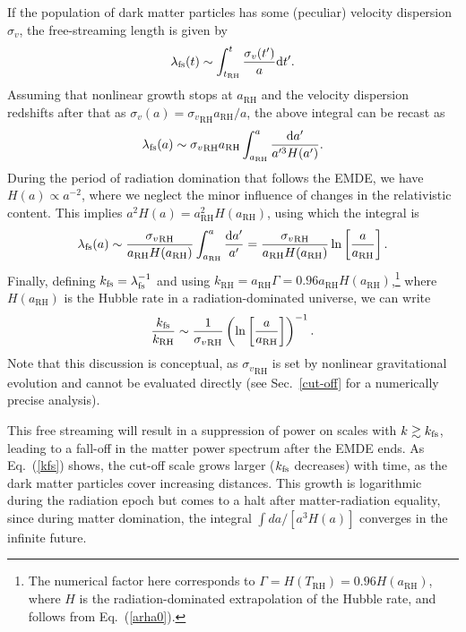 \documentclass[a4paper,11pt]{article}
\newcommand{\arh}{{a}_{\mathrm{RH}}}
\newcommand{\rh}[1]{{#1}_{\mathrm{RH}}}
\newcommand{\lfs}{\lambda_{\rm fs}}
\newcommand{\kfs}{k_{\rm fs}}
\newcommand{\diff}{\ensuremath{\mathrm{d}}}
\begin{document}
If the population of dark matter particles has some (peculiar) velocity dispersion $\sigma_v$, the free-streaming length is given by \begin{equation}
    \lfs (t) \sim \int^{t}_{\rh{t}} \frac{\sigma_v(t^\prime)}{a} \diff t^\prime.
\end{equation} Assuming that nonlinear growth stops at $\rh{a}$ and the velocity dispersion redshifts after that as $\sigma_v(a) = \rh{\sigma_v} \rh{a} / a$, the above integral can be recast as \begin{equation}
    \lfs (a) \sim  \rh{\sigma_v} \rh{a}\int^{a}_{\rh{a}} \frac{\diff a^\prime}{a^{\prime 3} H(a^\prime)}. 
\end{equation} During the period of radiation domination that follows the EMDE, we have $H(a) \propto a^{-2}$, where we neglect the minor influence of changes in the relativistic content. This implies $a^2 H(a) = \rh{a}^2 H(\rh{a})$, using which the integral is \begin{equation}\label{lfs}
    \lfs (a) \sim  \frac{\rh{\sigma_v}} {\rh{a} H(\rh{a})}\int^{a}_{\rh{a}} \frac{\diff a^\prime}{a^\prime} = \frac{\rh{\sigma_v}} {\rh{a} H(\rh{a})} \ln \left[\frac{a}{\rh{a}}\right].
\end{equation} Finally, defining $\kfs = \lfs^{-1}$ and using $\rh{k} = \rh{a} \Gamma = 0.96\rh{a} H(\rh{a})$,\footnote{\label{foot:H_RH}The numerical factor here corresponds to $\Gamma=H(\rh{T})=0.96 H(\rh{a})$, where $H$ is the radiation-dominated extrapolation of the Hubble rate, and follows from Eq.~(\ref{arha0}).}
where $H(\rh{a})$ is the Hubble rate in a radiation-dominated universe, we can write \begin{equation}\label{kfs}
    \frac{\kfs}{\rh{k}} \sim \frac{1}{\rh{\sigma_v}} \left(\ln \left[\frac{a}{\arh} \right] \right)^{-1}.
\end{equation}
Note that this discussion is conceptual, as $\rh{\sigma_v}$ is set by nonlinear gravitational evolution and cannot be evaluated directly (see Sec.~\ref{cut-off} for a numerically precise analysis).


This free streaming will result in a suppression of power on scales with $k \gtrsim \kfs$, leading to a fall-off in the matter power spectrum after the EMDE ends. As Eq.~(\ref{kfs}) shows, the cut-off scale grows larger ($\kfs$ decreases) with time, as the dark matter particles cover increasing distances. This growth is logarithmic during the radiation epoch but comes to a halt after matter-radiation equality, since during matter domination, the integral $\int da / [a^3 H(a)]$ converges in the infinite future. 
\end{document}
